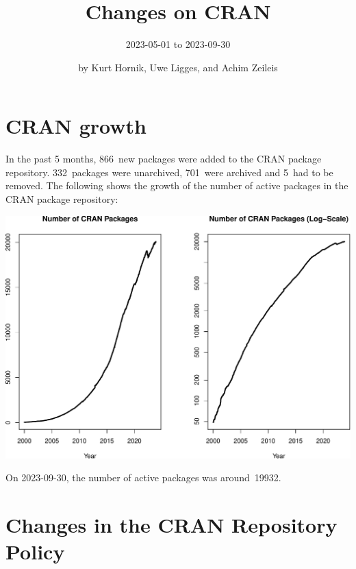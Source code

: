 \title{Changes on CRAN}

\subtitle{%
2023-05-01 to 2023-09-30
}

\author{by Kurt Hornik, Uwe Ligges, and Achim Zeileis}

\maketitle


\hypertarget{cran-growth}{%
\section{CRAN growth}\label{cran-growth}}

In the past 5 months, 866~new packages were
added to the CRAN package repository. 332~packages
were unarchived, 701~were archived and
5~had to be removed. The following shows the
growth of the number of active packages in the CRAN package repository:

\begin{center}\includegraphics[width=1\linewidth]{RJ-2023-3-cran_files/figure-latex/cran_growth-1} \end{center}

\noindent On 2023-09-30, the number of active packages was around~19932.

\hypertarget{changes-in-the-cran-repository-policy}{%
\section{Changes in the CRAN Repository Policy}\label{changes-in-the-cran-repository-policy}}

